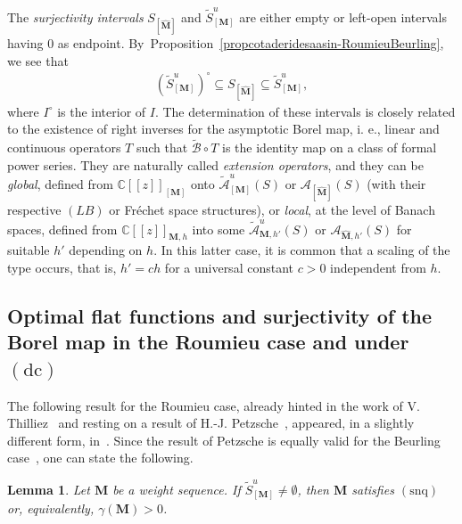 \documentclass[11pt,a4paper]{article}
\theoremstyle{plain}
\newtheorem{lemma}[theorem]{Lemma}
\theoremstyle{definition}
\numberwithin{equation}{section}
\newcommand{\C}{\mathbb{C}}
\newcommand{\M}{{\boldsymbol{M}}}
\newcommand{\hM}{\widehat{{\boldsymbol{M}}}}
\def\ga{\gamma}
\newcommand{\dc}{\operatorname{(dc)}}
\newcommand{\snq}{\operatorname{(snq)}}
\begin{document}
The \emph{surjectivity intervals} $S_{[\hM]}$ and $\widetilde{S}^u_{[\M]}$ are either empty or left-open intervals having $0$ as endpoint. By~Proposition~\ref{propcotaderidesaasin-RoumieuBeurling},
we see that
\begin{align}
(\widetilde{S}^u_{[\M]})^{\circ}\subseteq S_{[\hM]}\subseteq \widetilde{S}^u_{[\M]},
\label{equaContentionSurjectIntervals}
\end{align}
where $I^{\circ}$ is the interior of $I$. The determination of these intervals is closely related to the existence of right inverses for the asymptotic Borel map, i. e., linear and continuous operators $T$ such that $\widetilde{\mathcal{B}}\circ T$ is the identity map on a class of formal power series. They are naturally called \emph{extension operators}, and they can be \emph{global}, defined from  $\C[[z]]_{[\M]}$ onto $\widetilde{\mathcal{A}}^u_{[\M]}(S)$ or $\mathcal{A}_{[\hM]}(S)$ (with their respective $(LB)$ or Fr\'echet space structures), or \emph{local}, at the level of Banach spaces, defined from $\C[[z]]_{\M,h}$ into some $\widetilde{\mathcal{A}}^u_{\M,h'}(S)$ or $\mathcal{A}_{\hM,h'}(S)$ for suitable $h'$ depending on $h$. In this latter case, it is common that a scaling of the type occurs, that is, $h'=ch$ for a universal constant $c>0$ independent from $h$.



\subsection{Optimal flat functions and surjectivity of the Borel map in the Roumieu case and under $\dc$}\label{sectFlatFunctions}


The following result for the Roumieu case, already hinted in the work of V. Thilliez~\cite[Subsect. 3.3]{Thilliez03} and resting on a result of H.-J. Petzsche~\cite[Th. 3.5]{Petzsche88}, appeared, in a slightly different form, in~\cite[Lemma~4.5]{JimenezSanzSchindlInjectSurject}. Since the result of Petzsche is equally valid for the Beurling case~\cite[Th. 3.4]{Petzsche88}, one can state the following.

\begin{lemma}\label{lemma.SurjectImpliesgammaMpositive}
Let $\M$ be a weight sequence. If $\widetilde{S}^u_{[\M]}\neq\emptyset$, then $\M$ satisfies $\snq$ or, equivalently, $\ga(\M) >0$.
\end{lemma}
\end{document}
